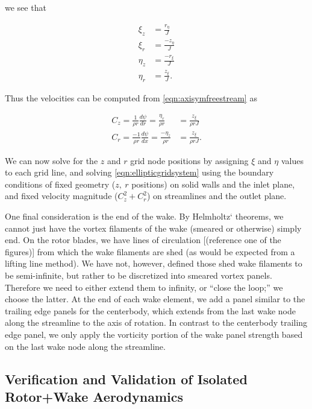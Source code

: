\noindent we see that

\begin{align}
    \xi_z &= \frac{r_\eta}{J} \\
    \xi_r &= \frac{-z_\eta}{J} \\
    \eta_z &= \frac{-r_\xi}{J} \\
    \eta_r &= \frac{z_\xi}{J}.
\end{align}

\noindent Thus the velocities can be computed from \cref{eqn:axisymfreestream} as

\begin{align}
    C_z = \frac{1}{\rho r} \frac{d\psi}{dr} = \frac{\eta_r}{\rho r} &= \frac{z_\xi}{\rho r J} \\
    C_r = \frac{-1}{\rho r} \frac{d\psi}{dx} = \frac{-\eta_z}{\rho r} &= \frac{z_\xi}{\rho r J}.
\end{align}


We can now solve for the \(z\) and \(r\) grid node positions by assigning \(\xi\) and \(\eta\) values to each grid line, and solving \cref{eqn:ellipticgridsystem} using the boundary conditions of fixed geometry (\(z,~r\) positions) on solid walls and the inlet plane, and fixed velocity magnitude (\(C_z^2+C_r^2\)) on streamlines and the outlet plane.


One final consideration is the end of the wake.
%
By Helmholtz` theorems, we cannot just have the vortex filaments of the wake (smeared or otherwise) simply end.
%
On the rotor blades, we have lines of circulation [(reference one of the figures)] from which the wake filaments are shed (as would be expected from a lifting line method).
%
We have not, however, defined those shed wake filaments to be semi-infinite, but rather to be discretized into smeared vortex panels.
%
Therefore we need to either extend them to infinity, or ``close the loop;'' we choose the latter.
%
At the end of each wake element, we add a panel similar to the trailing edge panels for the centerbody, which extends from the last wake node along the streamline to the axis of rotation.
%
In contrast to the centerbody trailing edge panel, we only apply the vorticity portion of the wake panel strength based on the last wake node along the streamline.


\subsection{Verification and Validation of Isolated Rotor+Wake Aerodynamics}
\label{ssec:rwvv}


